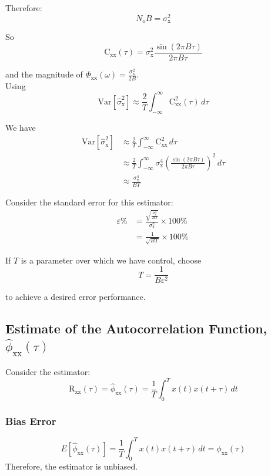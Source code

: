 \documentclass[12pt]{book}
\theoremstyle{definition}
\begin{document}
Therefore:
\[
N_o B = \sigma^2_\mathrm{x}
\]

So 
\[
\mathrm{C}_\mathrm{xx}(\tau) =  \sigma^2_\mathrm{x} \frac{\sin(2 \pi B \tau)}{2 \pi B \tau} 
\]

and the magnitude of \(\Phi_\mathrm{xx} (\omega) = \frac{\sigma^2_\mathrm{x} }{2 B}\).\\

Using
\[
{\mathrm{Var} [\hat{\sigma}^2_\mathrm{x}] \approx \frac{2}{T}\int_{-\infty}^\infty \mathrm{C}^2_\mathrm{xx}(\tau) \, d \tau}
\]

We have
\[
\begin{aligned}
    \text{Var}[\hat{\sigma}^2_\mathrm{x}] & \approx \frac{2}{T}  \int_{-\infty}^\infty \mathrm{C}^2_\mathrm{xx}  \, d \tau \\
        & \approx \frac{2}{T}  \int_{-\infty}^\infty \sigma^4_\mathrm{x} \left ( \frac{\sin(2 \pi B \tau)}{2 \pi B \tau} \right ) ^2 \, d \tau \\
        & \approx \frac{\sigma^4_\mathrm{x}}{BT} 
\end{aligned}
\]

Consider the standard error for this estimator:
\[
\begin{aligned}
    \varepsilon \% & = \frac{\sqrt{\frac{\sigma^4_\mathrm{x}}{B T}}}{\sigma^2_\mathrm{x}} \times 100\% \\
        & = \frac{1}{\sqrt{BT}} \times 100\% 
\end{aligned}
\
\]

If \(T\) is a parameter over which we have control, choose 
\[
T = \frac{1}{B \varepsilon^2}
\]

to achieve a desired error performance.

\subsection{Estimate of the Autocorrelation Function, \(\hat{\phi}_\mathrm{xx} (\tau)\)}


Consider the estimator:
\[
\mathrm{R}_\mathrm{xx} (\tau) = \hat{\phi}_\mathrm{xx} (\tau) = \frac{1}{T}\int_0^T x(t) x(t + \tau)\, dt
\]

\subsubsection*{Bias Error}

\[
E \left [ \hat{\phi}_\mathrm{xx} (\tau) \right ] = \frac{1}{T} \int_0^T x(t) x(t+\tau) \, dt = \phi_\mathrm{xx} (\tau)
\]
Therefore, the estimator is unbiased.
\end{document}

